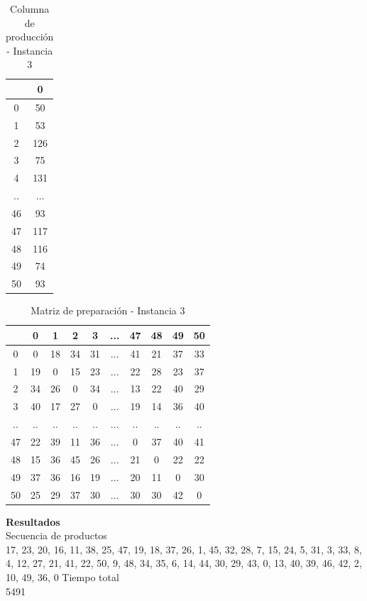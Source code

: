 \documentclass[twocolumn,10pt]{article}
\begin{document}
\begin{table}[h!]
\centering
\begin{tabular}{||c c||} 
 \hline
  &0 \\
\hline
   
0&50\\
1&53\\
2&126\\
3&75\\
4&131\\
..&...\\
46&93\\
47&117\\
48&116\\
49&74\\
50&93\\

\hline

\end{tabular}
\caption{Columna de producción - Instancia 3}
\label{table:1}
\end{table}



\begin{table}[h!]
\centering
\begin{tabular}{||c c c c c c c c c c||} 
 \hline
  &0 &  1 &  2 &  3  & ... &47&  48&  49&  50\\  
\hline
    
0& 0&18&34&31&...&41&21&37&33\\
1&19&0&15&23&...&22&28&23&37\\
2&34&26&0&34&...&13&22&40&29\\
3&40&17&27&0&...&19&14&36&40\\
..&..&..&..&..&...&..&..&..&..\\
47&22&39&11&36&...&0&37&40&41\\
48&15&36&45&26&...&21&0&22&22\\
49&37&36&16&19&...&20&11&0&30\\
50&25&29&37&30&...&30&30&42&0\\

\hline

\end{tabular}
\caption{Matriz de preparación - Instancia 3}
\label{table:1}
\end{table}


\textbf{Resultados}\\
Secuencia de productos\\
17, 23, 20, 16, 11, 38, 25, 47, 19, 18, 37, 26, 1, 45, 32, 28, 7, 15, 24, 5, 31, 3, 33, 8, 4, 12, 27, 21, 41, 22, 50, 9, 48, 34, 35, 6, 14, 44, 30, 29, 43, 0, 13, 40, 39, 46, 42, 2, 10, 49, 36, 0
Tiempo total\\
5491
\end{document}
